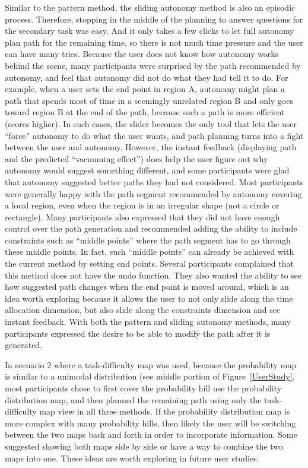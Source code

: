 \documentclass[journal]{IEEEtran}
\begin{document}
Similar to the pattern method, the sliding autonomy method is also an episodic process. Therefore, stopping in the middle of the planning to answer questions for the secondary task was easy. And it only takes a few clicks to let full autonomy plan path for the remaining time, so there is not much time pressure and the user can have many tries. Because the user does not know how autonomy works behind the scene, many participants were surprised by the path recommended by autonomy, and feel that autonomy did not do what they had tell it to do. For example, when a user sets the end point in region A, autonomy might plan a path that spends most of time in a seemingly unrelated region B and only goes toward region B at the end of the path, because such a path is more efficient (scores higher). In such cases, the slider becomes the only tool that lets the user ``force'' autonomy to do what the user wants, and path planning turns into a fight between the user and autonomy. However, the instant feedback (displaying path and the predicted ``vacuuming effect'') does help the user figure out why autonomy would suggest something different, and some participants were glad that autonomy suggested better paths they had not considered. Most participants were generally happy with the path segment recommended by autonomy covering a local region, even when the region is in an irregular shape (not a circle or rectangle). Many participants also expressed that they did not have enough control over the path generation and recommended adding the ability to include constraints such as ``middle points'' where the path segment has to go through these middle points. In fact, such ``middle points'' can already be achieved with the current method by setting end points. Several participants complained that this method does not have the undo function. They also wanted the ability to see how suggested path changes when the end point is moved around, which is an idea worth exploring because it allows the user to not only slide along the time allocation dimension, but also slide along the constraints dimension and see instant feedback. With both the pattern and sliding autonomy methods, many participants expressed the desire to be able to modify the path after it is generated.

In scenario 2 where a task-difficulty map was used, because the probability map is similar to a unimodal distribution (see middle portion of Figure~\ref{UserStudy}, most participants chose to first cover the probability hill use the probability distribution map, and then planned the remaining path using only the task-difficulty map view in all three methods. If the probability distribution map is more complex with many probability hills, then likely the user will be switching between the two maps back and forth in order to incorporate information. Some suggested showing both maps side by side or have a way to combine the two maps into one. These ideas are worth exploring in future user studies.
\end{document}
